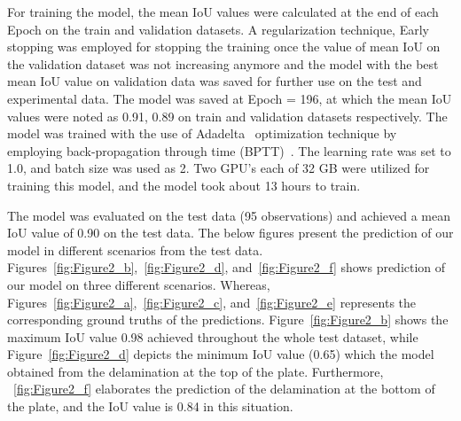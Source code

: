 For training the model, the mean IoU values were calculated at the end of each Epoch on the train and validation datasets.
A regularization technique, Early stopping was employed for stopping the training once the value of mean IoU on the validation dataset was not increasing anymore and the model with the best mean IoU value on validation data was saved for further use on the test and experimental data.
The model was saved at Epoch = 196, at which the mean IoU values were noted as 0.91, 0.89 on train and validation datasets respectively.
The model was trained with the use of Adadelta~\cite{zeiler2012adadelta} optimization technique by employing back-propagation through time (BPTT)~\cite{goodfellow2016deep}. 
The learning rate was set to 1.0, and batch size was used as 2.
Two GPU's each of 32 GB were utilized for training this model, and the model took about 13 hours to train.


The model was evaluated on the test data (95 observations) and achieved a mean IoU value of 0.90 on the test data.
The below figures present the prediction of our model in different scenarios from the test data.
Figures~\ref{fig:Figure2_b},~\ref{fig:Figure2_d}, and~\ref{fig:Figure2_f} shows prediction of our model on three different scenarios.
Whereas, Figures~\ref{fig:Figure2_a},~\ref{fig:Figure2_c}, and~\ref{fig:Figure2_e} represents the corresponding ground truths of the predictions.
Figure~\ref{fig:Figure2_b} shows the maximum IoU value 0.98 achieved throughout the whole test dataset, while Figure~\ref{fig:Figure2_d} depicts the minimum IoU value (0.65) which the model obtained from the delamination at the top of the plate.
Furthermore, ~\ref{fig:Figure2_f} elaborates the prediction of the delamination at the bottom of the plate, and the IoU value is 0.84 in this situation.

